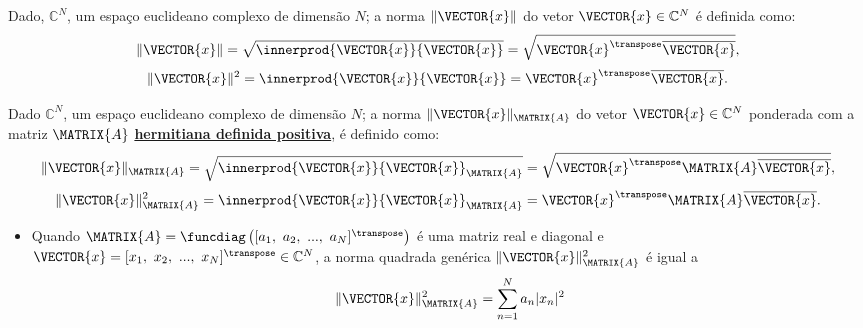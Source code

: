 \begin{definition}
Dado, $\mathbb{C}^N$, um espaço euclideano complexo de dimensão $N$;
a norma  $\|\VECTOR{x}\|$ do vetor $\VECTOR{x}\in \mathbb{C}^N$
é definida como:
\begin{equation}
\|\VECTOR{x}\|=\sqrt{\innerprod{\VECTOR{x}}{\VECTOR{x}}}
=\sqrt{\VECTOR{x}^{\transpose} \overline{\VECTOR{x}}}
,
\end{equation} 
\begin{equation}
\|\VECTOR{x}\|^2=\innerprod{\VECTOR{x}}{\VECTOR{x}}
=\VECTOR{x}^{\transpose} \overline{\VECTOR{x}}
.
\end{equation} 
\end{definition}

\begin{definition}
Dado $\mathbb{C}^N$, um espaço euclideano complexo de dimensão $N$;
a norma  $\|\VECTOR{x}\|_{\MATRIX{A}}$ do vetor $\VECTOR{x}\in \mathbb{C}^N$
ponderada com a matriz $\MATRIX{A}$ \hyperref[def:hermitianapositivematrix0]{\textbf{hermitiana definida positiva}},
é definido como:
\vspace{-10pt}
\begin{equation}
\|\VECTOR{x}\|_{\MATRIX{A}}=\sqrt{\innerprod{\VECTOR{x}}{\VECTOR{x}}_{\MATRIX{A}}}
=\sqrt{\VECTOR{x}^{\transpose}\MATRIX{A} \overline{\VECTOR{x}}}
,
\end{equation} 
\begin{equation}
\|\VECTOR{x}\|_{\MATRIX{A}}^2=\innerprod{\VECTOR{x}}{\VECTOR{x}}_{\MATRIX{A}}
=\VECTOR{x}^{\transpose}\MATRIX{A} \overline{\VECTOR{x}}
.
\end{equation} 
\end{definition}

\begin{tcbattention}
\begin{itemize}
\item Quando $\MATRIX{A}=\funcdiag\left([a_1,~a_2,~...,~a_N]^{\transpose}\right)$ 
é uma matriz real e diagonal e
$\VECTOR{x}=[x_1,~x_2,~...,~x_N]^{\transpose} \in \mathbb{C}^N$, 
a norma quadrada genérica $\|\VECTOR{x}\|_{\MATRIX{A}}^2$ é igual a
\vspace{-10pt}
\begin{equation}
\|\VECTOR{x}\|_{\MATRIX{A}}^2=\sum_{n=1}^{N} a_{n}|x_n|^2
\end{equation}
\end{itemize}
\end{tcbattention}

